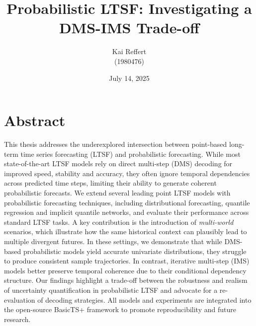 \documentclass[a4paper,oneside,bibliography=totoc]{scrbook}
\begin{document}
\frontmatter \subject{Master Thesis} %
\title{Probabilistic LTSF: Investigating a DMS-IMS Trade-off}
\author{Kai Reffert\\
  (1980476)} \date{July 14, 2025}
\publishers{{\small Submitted to}\\
  Data and Web Science Group\\
  Prof.\ Dr.\ Rainer Gemulla\\
  University of Mannheim\\}
\maketitle

\chapter{Abstract}
This thesis addresses the underexplored intersection between point-based long-term time series forecasting (LTSF) and probabilistic forecasting. While most state-of-the-art LTSF models rely on direct multi-step (DMS) decoding for improved speed, stability and accuracy, they often ignore temporal dependencies across predicted time steps, limiting their ability to generate coherent probabilistic forecasts. We extend several leading point LTSF models with probabilistic forecasting techniques, including distributional forecasting, quantile regression and implicit quantile networks, and evaluate their performance across standard LTSF tasks. 
A key contribution is the introduction of \textit{multi-world} scenarios, which illustrate how the same historical context can plausibly lead to multiple divergent futures.
In these settings, we demonstrate that while DMS-based probabilistic models yield accurate univariate distributions, they struggle to produce consistent sample trajectories. In contrast, iterative multi-step (IMS) models better preserve temporal coherence due to their conditional dependency structure. Our findings highlight a trade-off between the robustness and realism of uncertainty quantification in probabilistic LTSF and advocate for a re-evaluation of decoding strategies. All models and experiments are integrated into the open-source BasicTS+ framework to promote reproducibility and future research.

\end{document}
